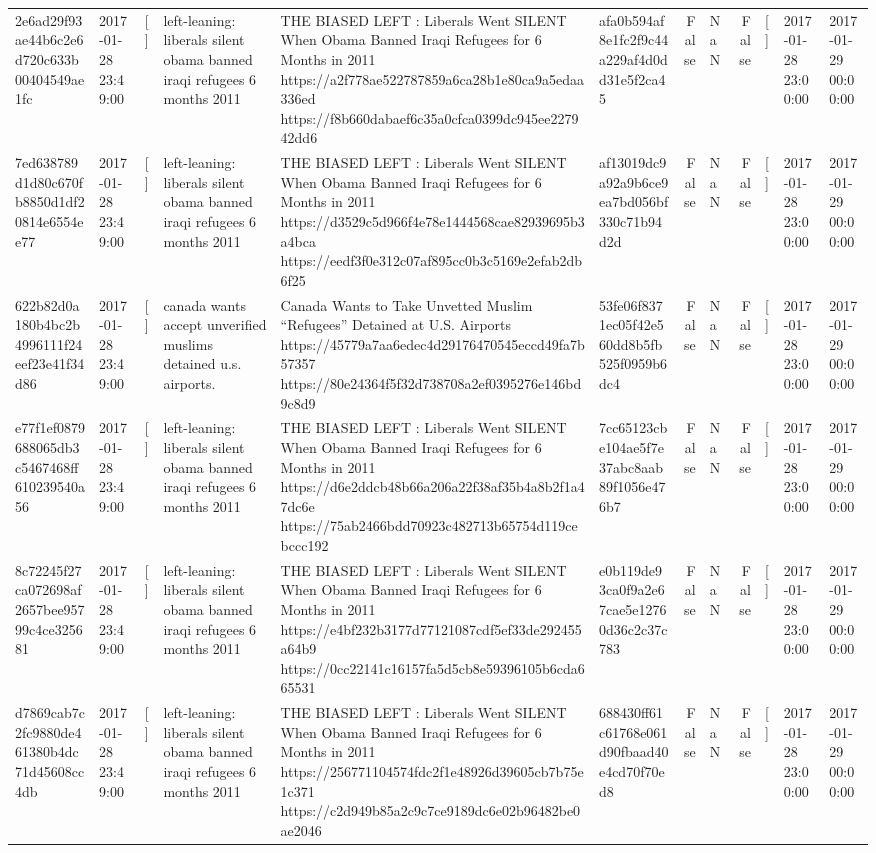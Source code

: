 \begin{tabular}{llllllrlrlll}
2e6ad29f93ae44b6c2e6d720c633b00404549ae1fc & 2017-01-28 23:49:00 & [] & left-leaning: liberals silent obama banned iraqi refugees 6 months 2011 & THE BIASED LEFT : Liberals Went SILENT When Obama Banned Iraqi Refugees for 6 Months in 2011 https://a2f778ae522787859a6ca28b1e80ca9a5edaa336ed https://f8b660dabaef6c35a0cfca0399dc945ee227942dd6 & afa0b594af8e1fc2f9c44a229af4d0dd31e5f2ca45 & False & NaN & False & [] & 2017-01-28 23:00:00 & 2017-01-29 00:00:00 \\
7ed638789d1d80c670fb8850d1df20814e6554ee77 & 2017-01-28 23:49:00 & [] & left-leaning: liberals silent obama banned iraqi refugees 6 months 2011 & THE BIASED LEFT : Liberals Went SILENT When Obama Banned Iraqi Refugees for 6 Months in 2011 https://d3529c5d966f4e78e1444568cae82939695b3a4bca https://eedf3f0e312c07af895cc0b3c5169e2efab2db6f25 & af13019dc9a92a9b6ce9ea7bd056bf330c71b94d2d & False & NaN & False & [] & 2017-01-28 23:00:00 & 2017-01-29 00:00:00 \\
622b82d0a180b4bc2b4996111f24eef23e41f34d86 & 2017-01-28 23:49:00 & [] & canada wants accept unverified muslims detained u.s. airports. & Canada Wants to Take Unvetted Muslim “Refugees” Detained at U.S. Airports https://45779a7aa6edec4d29176470545eccd49fa7b57357 https://80e24364f5f32d738708a2ef0395276e146bd9c8d9 & 53fe06f8371ec05f42e560dd8b5fb525f0959b6dc4 & False & NaN & False & [] & 2017-01-28 23:00:00 & 2017-01-29 00:00:00 \\
e77f1ef0879688065db3c5467468ff610239540a56 & 2017-01-28 23:49:00 & [] & left-leaning: liberals silent obama banned iraqi refugees 6 months 2011 & THE BIASED LEFT : Liberals Went SILENT When Obama Banned Iraqi Refugees for 6 Months in 2011 https://d6e2ddcb48b66a206a22f38af35b4a8b2f1a47dc6e https://75ab2466bdd70923c482713b65754d119cebccc192 & 7cc65123cbe104ae5f7e37abc8aab89f1056e476b7 & False & NaN & False & [] & 2017-01-28 23:00:00 & 2017-01-29 00:00:00 \\
8c72245f27ca072698af2657bee95799c4ce325681 & 2017-01-28 23:49:00 & [] & left-leaning: liberals silent obama banned iraqi refugees 6 months 2011 & THE BIASED LEFT : Liberals Went SILENT When Obama Banned Iraqi Refugees for 6 Months in 2011 https://e4bf232b3177d77121087cdf5ef33de292455a64b9 https://0cc22141c16157fa5d5cb8e59396105b6cda665531 & e0b119de93ca0f9a2e67cae5e12760d36c2c37c783 & False & NaN & False & [] & 2017-01-28 23:00:00 & 2017-01-29 00:00:00 \\
d7869cab7c2fc9880de461380b4dc71d45608cc4db & 2017-01-28 23:49:00 & [] & left-leaning: liberals silent obama banned iraqi refugees 6 months 2011 & THE BIASED LEFT : Liberals Went SILENT When Obama Banned Iraqi Refugees for 6 Months in 2011 https://256771104574fdc2f1e48926d39605cb7b75e1c371 https://c2d949b85a2c9c7ce9189dc6e02b96482be0ae2046 & 688430ff61c61768e061d90fbaad40e4cd70f70ed8 & False & NaN & False & [] & 2017-01-28 23:00:00 & 2017-01-29 00:00:00 \\

\end{tabular}
